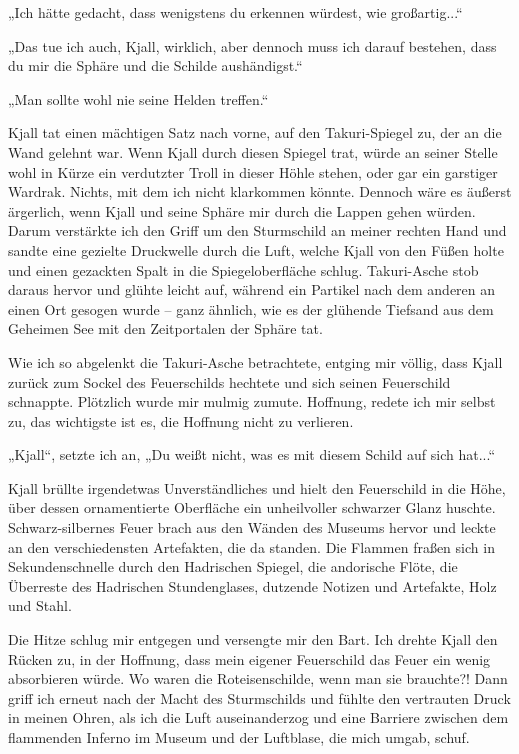 „Ich hätte gedacht, dass wenigstens du erkennen würdest, wie großartig...“

„Das tue ich auch, Kjall, wirklich, aber dennoch muss ich darauf bestehen, dass du mir die Sphäre und die Schilde aushändigst.“

„Man sollte wohl nie seine Helden treffen.“

Kjall tat einen mächtigen Satz nach vorne, auf den Takuri-Spiegel zu, der an die Wand gelehnt war. Wenn Kjall durch diesen Spiegel trat, würde an seiner Stelle wohl in Kürze ein verdutzter Troll in dieser Höhle stehen, oder gar ein garstiger Wardrak. Nichts, mit dem ich nicht klarkommen könnte. Dennoch wäre es äußerst ärgerlich, wenn Kjall und seine Sphäre mir durch die Lappen gehen würden. Darum verstärkte ich den Griff um den Sturmschild an meiner rechten Hand und sandte eine gezielte Druckwelle durch die Luft, welche Kjall von den Füßen holte und einen gezackten Spalt in die Spiegeloberfläche schlug. Takuri-Asche stob daraus hervor und glühte leicht auf, während ein Partikel nach dem anderen an einen Ort gesogen wurde – ganz ähnlich, wie es der glühende Tiefsand aus dem Geheimen See mit den Zeitportalen der Sphäre tat.

Wie ich so abgelenkt die Takuri-Asche betrachtete, entging mir völlig, dass Kjall zurück zum Sockel des Feuerschilds hechtete und sich seinen Feuerschild schnappte. Plötzlich wurde mir mulmig zumute. Hoffnung, redete ich mir selbst zu, das wichtigste ist es, die Hoffnung nicht zu verlieren.

„Kjall“, setzte ich an, „Du weißt nicht, was es mit diesem Schild auf sich hat...“

Kjall brüllte irgendetwas Unverständliches und hielt den Feuerschild in die Höhe, über dessen ornamentierte Oberfläche ein unheilvoller schwarzer Glanz huschte. Schwarz-silbernes Feuer brach aus den Wänden des Museums hervor und leckte an den verschiedensten Artefakten, die da standen. Die Flammen fraßen sich in Sekundenschnelle durch den Hadrischen Spiegel, die andorische Flöte, die Überreste des Hadrischen Stundenglases, dutzende Notizen und Artefakte, Holz und Stahl.

Die Hitze schlug mir entgegen und versengte mir den Bart. Ich drehte Kjall den Rücken zu, in der Hoffnung, dass mein eigener Feuerschild das Feuer ein wenig absorbieren würde. Wo waren die Roteisenschilde, wenn man sie brauchte?! Dann griff ich erneut nach der Macht des Sturmschilds und fühlte den vertrauten Druck in meinen Ohren, als ich die Luft auseinanderzog und eine Barriere zwischen dem flammenden Inferno im Museum und der Luftblase, die mich umgab, schuf.


